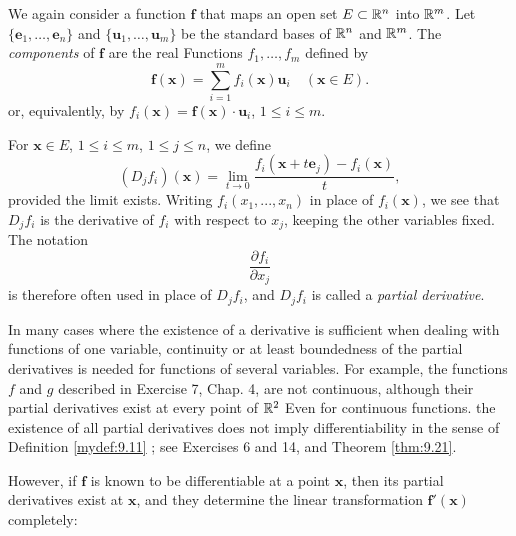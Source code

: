 
\begin{mydef}
    \label{mydef:9.16}
    We again consider a function $\mathbf{f}$ that maps an open set $E \subset {\protect\mathbb R}^n$ into ${\protect\mathbb R}^m$.
    Let $\{\mathbf{e}_1, \dots, \mathbf{e}_n\}$
    and $\{\mathbf{u}_1, \dots, \mathbf{u}_m\}$ 
    be the standard bases of ${\protect\mathbb R}^n$ and ${\protect\mathbb R}^m$.
    The \emph{components} of $\mathbf{f}$ are the real Functions
    $f_1, \dots, f_m$ defined by 
    \begin{equation}
        \label{eq:9.24}
        \mathbf{f(x)} = 
        \sum_{i=1}^{m} f_i(\mathbf{x}) \mathbf{u}_i
        \quad 
        (\mathbf{x} \in E).
    \end{equation}
    or, equivalently, by $f_i(\mathbf{x}) = \mathbf{f(x)}\cdot \mathbf{u}_i$, $1 \leq i \leq m$.

    For $\mathbf{x} \in E$, $1 \leq i \leq m$, $1 \leq j \leq n$, we define 
    \begin{equation}
        \label{eq:9.25}
        (D_j f_i)(\mathbf{x}) =
        \lim_{t \to 0} \frac{f_i(\mathbf{x} + t \mathbf{e}_j) - f_i (\mathbf{x})}{t},
    \end{equation}
    provided the limit exists.
    Writing $f_i(x_1 , ... , x_n)$ in place of $f_i(\mathbf{x})$, we see that $D_j f_i$ is the derivative of $f_i$ with respect to $x_j$, keeping the other variables fixed.
    The notation
    \begin{equation}
        \label{eq:9.26}
        \frac{\partial f_i}{\partial x_j}
    \end{equation}
    is therefore often used in place of $D_j f_i$, 
    and $D_j f_i$ is called a \emph{partial derivative}.
\end{mydef}

In many cases where the existence of a derivative is sufficient when dealing
with functions of one variable, continuity or at least boundedness of the partial derivatives is needed for functions of several variables. 
For example, the functions $f$ and $g$ described in Exercise 7, Chap. 4, are not continuous, although their partial derivatives exist at every point of ${\protect\mathbb R}^2$ Even for continuous functions.
the existence of all partial derivatives does not imply differentiability in the sense
of Definition \ref{mydef:9.11} ; see Exercises 6 and 14, and Theorem \ref{thm:9.21}.

However, if $\mathbf{f}$ is known to be differentiable at a point $\mathbf{x}$, then its partial derivatives exist at $\mathbf{x}$, and they determine the linear transformation $\mathbf{f'(x)}$ completely:

